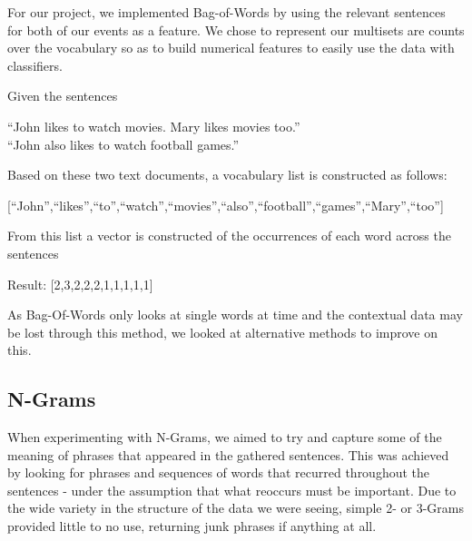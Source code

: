 \documentclass[bsc,frontabs,twoside,singlespacing,parskip,deptreport]{infthesis}     %
\begin{document}
For our project, we implemented Bag-of-Words by using the relevant sentences for both of our events as a feature.
We chose to represent our multisets are counts over the vocabulary so as to build numerical features to easily
use the data with classifiers.
\begin{tcolorbox}[width=\textwidth,
                  interior hidden,
                  boxsep=10pt,
                  left=0pt,
                  right=0pt,
                  top=2pt,
                  ]%
  Given the sentences \vspace{0.5em}\\
  \begin{center}``John likes to watch movies. Mary likes movies too.''\\
  ``John also likes to watch football games.''\vspace{1em}\\
   \end{center}
    Based on these two text documents, a vocabulary list is constructed as follows:\vspace{1em}\\
    \begin{center}
  [``John'',``likes'',``to'',``watch'',``movies'',``also'',``football'',``games'',``Mary'',``too'']\vspace{1em}\\
\end{center}
    From this list a vector is constructed of the occurrences
    of each word across the sentences\vspace{1em}\\
 \begin{center} 
  Result: [2,3,2,2,2,1,1,1,1,1]
\end{center}
\end{tcolorbox}

As Bag-Of-Words only looks at single words at time and the contextual data may be lost through this method, we looked at
alternative methods to improve on this.

\subsection{N-Grams}
When experimenting with N-Grams, we aimed to try and capture some of the meaning of phrases that appeared in the gathered
sentences.
This was achieved by looking for phrases and sequences of words that recurred throughout the sentences - under the assumption
that what reoccurs must be important. Due to the wide variety in the structure of the data we were seeing,
simple 2- or 3-Grams provided little to no use, returning junk phrases if anything at all.
\end{document}
